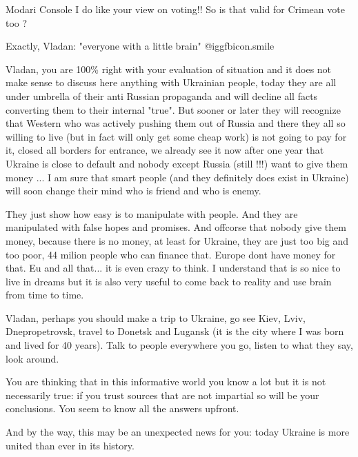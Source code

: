\begin{itemize}
\begin{itemize}
Modari Console I do like your view on voting!! So is that valid for Crimean vote too ?

Exactly, Vladan: "everyone with a little brain"  @igg{fbicon.smile} 


Vladan, you are 100\% right with your evaluation of situation and it does not
make sense to discuss here anything with Ukrainian people, today they are all
under umbrella of their anti Russian propaganda and will decline all facts
converting them to their internal "true". But sooner or later they will
recognize that Western who was actively pushing them out of Russia and there
they all so willing to live (but in fact will only get some cheap work) is not
going to pay for it, closed all borders for entrance, we already see it now
after one year that Ukraine is close to default and nobody except Russia (still
!!!) want to give them money ... I am sure that smart people (and they
definitely does exist in Ukraine) will soon change their mind who is friend and
who is enemy.


They just show how easy is to manipulate with people. And they are manipulated
with false hopes and promises. And offcorse that nobody give them money,
because there is no money, at least for Ukraine, they are just too big and too
poor, 44 milion people who can finance that. Europe dont have money for that.
Eu and all that... it is even crazy to think. I understand that is so nice to
live in dreams but it is also very useful to come back to reality and use brain
from time to time.


Vladan, perhaps you should make a trip to Ukraine, go see Kiev, Lviv,
Dnepropetrovsk, travel to Donetsk and Lugansk (it is the city where I was born
and lived for 40 years). Talk to people everywhere you go, listen to what they
say, look around.

You are thinking that in this informative world you know a lot but it is not
necessarily true: if you trust sources that are not impartial so will be your
conclusions. You seem to know all the answers upfront.

And by the way, this may be an unexpected news for you: today Ukraine is more
united than ever in its history.



\end{itemize}
\end{itemize}
